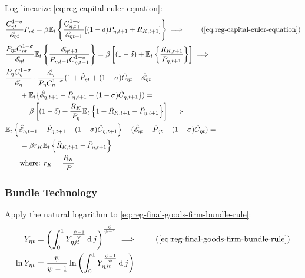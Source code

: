 \documentclass[../thesis.tex]{subfiles}
\begin{document}
Log-linearize \ref{eq:reg-capital-euler-equation}:
	\begin{alignat}{2}
		& \frac{ C_{\eta t}^{1-\sigma}}{ \te} P_{\eta t} = \beta \mathbb{E}_t \left\{ \frac{ C_{\eta, t+1}^{1-\sigma}}{ \te[t+1]} [(1-\delta) P_{\eta, t+1} + R_{K,t+1}] \right\} \implies \tag{\ref{eq:reg-capital-euler-equation}} \\
		& \frac{P_{\eta t} C_{\eta t}^{1-\sigma}}{\te} \mathbb{E}_t \left\{ \frac{\te[t+1]}{P_{\eta, t+1} C_{\eta, t+1}^{1-\sigma}} \right\} = \beta \left[ (1-\delta) + \mathbb{E}_t \left\{ \frac{R_{K,t+1}}{P_{\eta, t+1}} \right\} \right] \implies \nonumber \\
		& \frac{P_{\eta} C_{\eta}^{1-\sigma}}{\te[]} \cdot \frac{\te[]}{P_{\eta} C_{\eta}^{1-\sigma}} (1 + \hat{P}_{\eta t} + (1 -\sigma) \hat{C}_{\eta t} - \hat{\mathscr{E}}_{\eta t} + \nonumber \\ 
		& \qquad + \E \{\hat{\mathscr{E}}_{\eta, t+1} - \hat{P}_{\eta, t+1} - (1 -\sigma) \hat{C}_{\eta, t+1}\}) = \nonumber \\
		& \qquad = \beta \left[ (1-\delta) + \frac{R_{K}}{P_{\eta}} \mathbb{E}_t \left\{ 1 + \hat{R}_{K, t+1} -\hat{P}_{\eta, t+1} \right\} \right] \implies \nonumber \\
		& \E \left\{ \hat{\mathscr{E}}_{\eta, t+1} - \hat{P}_{\eta, t+1}  - (1 -\sigma) \hat{C}_{\eta, t+1} \right\} - (\hat{\mathscr{E}}_{\eta t} - \hat{P}_{\eta t} - (1 -\sigma) \hat{C}_{\eta t}) = \nonumber \\
		& \qquad = \beta r_{K} \mathbb{E}_t \left\{ \hat{R}_{K, t+1} - \hat{P}_{\eta, t+1} \right\} \label{eq:reg-ll-capital-euler-equation} \\
		& \qquad \text{where: } r_{K} = \frac{R_{K}}{P_{}} \label{eq:reg-rk}
	\end{alignat}
	

	\subsubsection*{Bundle Technology}

Apply the natural logarithm to \ref{eq:reg-final-goods-firm-bundle-rule}:
\begin{align}
	Y_{\eta t} &= \left( \int_{0}^{1} Y_{\eta jt}^{\frac{\psi-1}{\psi}} \dif j \right)^{\frac{\psi}{\psi-1}} \implies  \tag{\ref{eq:reg-final-goods-firm-bundle-rule}} \\
	\ln{Y_{\eta t}} &= {\frac{\psi}{\psi-1}} \ln{\left( \int_{0}^{1} Y_{\eta jt}^{\frac{\psi-1}{\psi}} \dif j \right)} \nonumber
\end{align}
\end{document}
